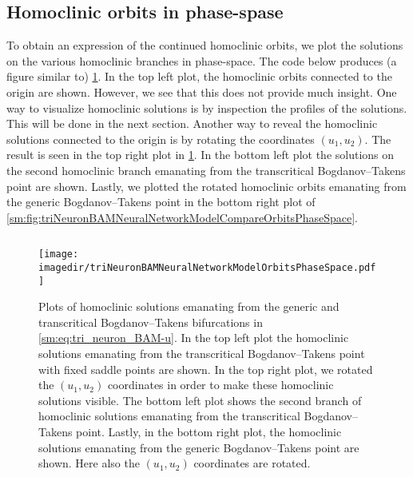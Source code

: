 \subsection{Homoclinic orbits in phase-spase}
To obtain an expression of the continued homoclinic orbits,
we plot the solutions on the various homoclinic branches in phase-space.
The code below produces (a figure similar to)
\cref{sm:fig:triNeuronBAMNeuralNetworkModelOrbitsPhaseSpace}.
In the top left plot, the homoclinic orbits connected to the origin are shown. However,
we see that this does not provide much insight. 
One way to visualize homoclinic solutions is by inspection the
profiles of the solutions. This will be done in the next section.
Another way to reveal the homoclinic solutions connected to the origin is by
rotating the coordinates $(u_1,u_2)$. The result is seen in the top right
plot in \cref{sm:fig:triNeuronBAMNeuralNetworkModelOrbitsPhaseSpace}.
In the bottom left plot the solutions on the second homoclinic branch emanating
from the transcritical Bogdanov--Takens point are shown. Lastly, we plotted the
rotated homoclinic orbits emanating from the generic
Bogdanov--Takens point in the bottom right plot of
\cref{sm:fig:triNeuronBAMNeuralNetworkModelCompareOrbitsPhaseSpace}.
\inputminted[firstline=269, lastline=335]{MATLAB}{\pathToDDEBifToolDemos/BAM_neural_network_model/BAMnn.m}
\begin{figure}[ht!]
    \texttt{[image: \\imagedir/triNeuronBAMNeuralNetworkModelOrbitsPhaseSpace.pdf]}
    \caption{
    Plots of homoclinic solutions emanating from the generic and transcritical
    Bogdanov--Takens bifurcations in \cref{sm:eq:tri_neuron_BAM-u}. In the top
    left plot the homoclinic solutions emanating from the transcritical
    Bogdanov--Takens point with fixed saddle points are shown. In the top right
    plot, we rotated the $(u_1, u_2)$ coordinates in order to make these
    homoclinic solutions visible. The bottom left plot shows the second branch
    of homoclinic solutions emanating from the transcritical Bogdanov--Takens
    point. Lastly, in the bottom right plot, the homoclinic solutions emanating
    from the generic Bogdanov--Takens point are shown. Here also the $(u_1,
    u_2)$ coordinates are rotated.
    }
    \label{sm:fig:triNeuronBAMNeuralNetworkModelOrbitsPhaseSpace}
\end{figure}


